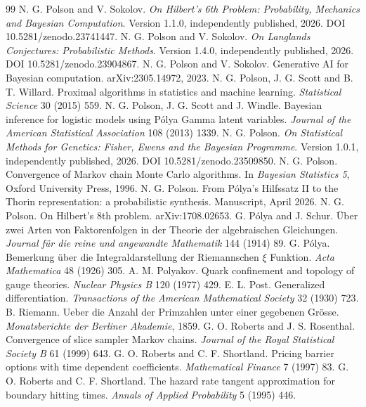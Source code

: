 \begin{thebibliography}{99}
 N. G. Polson and V. Sokolov. \emph{On Hilbert's 6th Problem: Probability, Mechanics and Bayesian Computation}. Version 1.1.0, independently published, 2026. DOI 10.5281/zenodo.23741447.
 N. G. Polson and V. Sokolov. \emph{On Langlands Conjectures: Probabilistic Methods}. Version 1.4.0, independently published, 2026. DOI 10.5281/zenodo.23904867.
 N. G. Polson and V. Sokolov. Generative AI for Bayesian computation. arXiv:2305.14972, 2023.
 N. G. Polson, J. G. Scott and B. T. Willard. Proximal algorithms in statistics and machine learning. \emph{Statistical Science} 30 (2015) 559.
 N. G. Polson, J. G. Scott and J. Windle. Bayesian inference for logistic models using P\'olya Gamma latent variables. \emph{Journal of the American Statistical Association} 108 (2013) 1339.
 N. G. Polson. \emph{On Statistical Methods for Genetics: Fisher, Ewens and the Bayesian Programme}. Version 1.0.1, independently published, 2026. DOI 10.5281/zenodo.23509850.
 N. G. Polson. Convergence of Markov chain Monte Carlo algorithms. In \emph{Bayesian Statistics 5}, Oxford University Press, 1996.
 N. G. Polson. From P\'olya's Hilfssatz II to the Thorin representation: a probabilistic synthesis. Manuscript, April 2026.
 N. G. Polson. On Hilbert's 8th problem. arXiv:1708.02653.
 G. P\'olya and J. Schur. \"Uber zwei Arten von Faktorenfolgen in der Theorie der algebraischen Gleichungen. \emph{Journal f\"ur die reine und angewandte Mathematik} 144 (1914) 89.
 G. P\'olya. Bemerkung \"uber die Integraldarstellung der Riemannschen $\xi$ Funktion. \emph{Acta Mathematica} 48 (1926) 305.
 A. M. Polyakov. Quark confinement and topology of gauge theories. \emph{Nuclear Physics B} 120 (1977) 429.
 E. L. Post. Generalized differentiation. \emph{Transactions of the American Mathematical Society} 32 (1930) 723.
 B. Riemann. Ueber die Anzahl der Primzahlen unter einer gegebenen Gr\"osse. \emph{Monatsberichte der Berliner Akademie}, 1859.
 G. O. Roberts and J. S. Rosenthal. Convergence of slice sampler Markov chains. \emph{Journal of the Royal Statistical Society B} 61 (1999) 643.
 G. O. Roberts and C. F. Shortland. Pricing barrier options with time dependent coefficients. \emph{Mathematical Finance} 7 (1997) 83.
 G. O. Roberts and C. F. Shortland. The hazard rate tangent approximation for boundary hitting times. \emph{Annals of Applied Probability} 5 (1995) 446.

\end{thebibliography}
